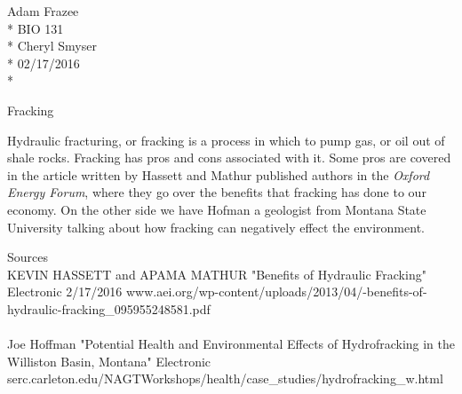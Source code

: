 \documentclass[12pt]{article}
\begin{document}
	\begin{flushleft}
		Adam Frazee \\*
		BIO 131\\*
		Cheryl Smyser\\*
		02/17/2016\\*
	\end{flushleft}

\begin{center}
 \Large{Fracking}
\end{center}
\doublespacing

Hydraulic fracturing, or fracking is a process in which to pump gas, or oil out of shale rocks. Fracking has pros and cons associated with it. Some pros are covered in the article written by Hassett and Mathur published authors in the \textit{Oxford Energy Forum}, where they go over the benefits that fracking has done to our economy. On the other side we have Hofman a geologist from Montana State University talking about how fracking can negatively effect the environment.

 


\singlespacing
\noindent \large{Sources}\\
KEVIN HASSETT and APAMA MATHUR "Benefits of Hydraulic Fracking" Electronic 
2/17/2016 www.aei.org/wp-content/uploads/2013/04/-benefits-of-hydraulic-fracking\_095955248581.pdf 
\\
\\
Joe Hoffman "Potential Health and Environmental Effects of Hydrofracking in the Williston Basin, Montana" Electronic serc.carleton.edu/NAGTWorkshops/health/case\_studies/hydrofracking\_w.html
\end{document}
